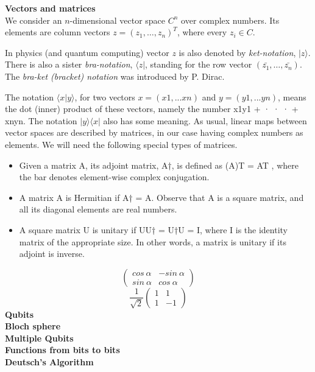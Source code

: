 \textbf{Vectors and matrices}\\
We consider an $n$-dimensional vector space $C^n$ over complex numbers.
Its elements are column vectors $z = (z_1,\dots,z_n)^T$,
where every $z_i \in C$.

In physics (and quantum computing) vector $z$ is also denoted by \textit{ket-notation},
$|z\rangle$.
There is also a sister \textit{bra-notation}, $\langle z|$,
standing for the row vector $(\bar{z_1}, \dots , \bar{z_n})$.
The \textit{bra-ket (bracket) notation} was introduced by P. Dirac.

The notation $\langle x|y \rangle$,
for two vectors $x = (x1, . . . xn)$ and $y = (y1, . . . yn)$,
means the dot (inner) product of these vectors,
namely the number x1y1 + · · · + xnyn.
The notation $|y\rangle\langle x|$ also has some meaning.
As usual, linear maps between vector spaces are described by matrices,
in our case having complex numbers as elements.
We will need the following special types of matrices.
\begin{itemize}
    \item Given a matrix A,
    its adjoint matrix,
    A†, is defined as (A)T = AT ,
    where the bar denotes element-wise complex conjugation.
    \item A matrix A is Hermitian if A† = A. Observe that A is a square matrix, and all its diagonal elements are real numbers.
    \item A square matrix U is unitary if UU† = U†U = I,
    where I is the identity matrix of the appropriate size. In other words, a matrix is unitary if its adjoint is inverse.
\end{itemize}

$$
\begin{pmatrix}
    cos\ \alpha & -sin\ \alpha  \\
    sin\ \alpha & cos\ \alpha
\end{pmatrix}
$$
$$
\frac{1}{\sqrt{2}}
\begin{pmatrix}
    1 & 1  \\
    1 & -1
\end{pmatrix}
$$
\textbf{Qubits}\\
\textbf{Bloch sphere}\\
\textbf{Multiple Qubits}\\
\textbf{Functions from bits to bits}\\
\textbf{Deutsch’s Algorithm}\\
